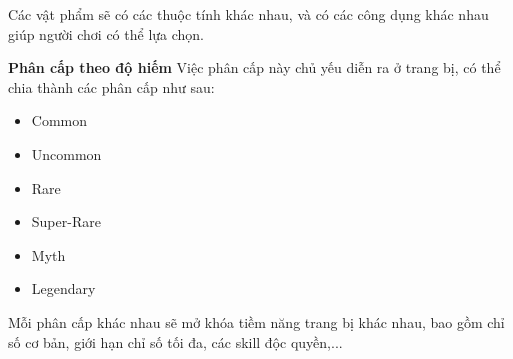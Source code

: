Các vật phẩm sẽ có các thuộc tính khác nhau, và có các công dụng khác nhau giúp người chơi có thể lựa chọn.

\textbf{Phân cấp theo độ hiếm}
Việc phân cấp này chủ yếu diễn ra ở trang bị, có thể chia thành các phân cấp như sau:
\begin{itemize}
	\item Common
	\item Uncommon
	\item Rare
	\item Super-Rare
	\item Myth
	\item Legendary
\end{itemize}

Mỗi phân cấp khác nhau sẽ mở khóa tiềm năng trang bị khác nhau, bao gồm chỉ số cơ bản, giới hạn chỉ số tối đa, các skill độc quyền,...

